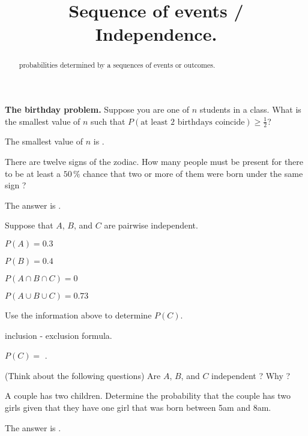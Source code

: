 \documentclass{ximera}
\title{Sequence of events / Independence.}
\begin{document}
\begin{abstract}
probabilities determined by a sequences of events or outcomes.
\end{abstract}
\maketitle

\begin{question} 
     {\bf The birthday problem.} Suppose you are one of $n$ students in a class. What is the smallest value of $n$ such that $P(\text{at least 2 birthdays coincide})\geq \tfrac{1}{2}$?
     \begin{solution}
          The smallest value of $n$ is .
     \end{solution}
\end{question}

\begin{question}
There are twelve signs of the zodiac. How many people must be present for there to be at least a $50\,\%$ chance that two or more of them were born under the same sign ?
     \begin{solution}
     The answer is .
     \end{solution}
\end{question}

Suppose that $A$, $B$, and $C$ are pairwise independent.  

$ P(A) = 0.3 $

$ P(B) = 0.4 $

$ P(A\cap B\cap C) = 0$

$ P(A\cup B\cup C) = 0.73$

\begin{question}
Use the information above to determine $P(C)$.
     \begin{hint}
          inclusion - exclusion formula.
     \end{hint}
     \begin{solution}
     $P(C) = $ . 
     \end{solution}
\end{question}

(Think about the following questions)  Are $A$, $B$, and $C$ independent ? Why ?

\begin{question}
A couple has two children.  Determine the probability that the couple has two girls given that they have one girl that was born between 5am and 8am.     
     \begin{solution}
           The answer is .
     \end{solution}
\end{question}
\end{document}
